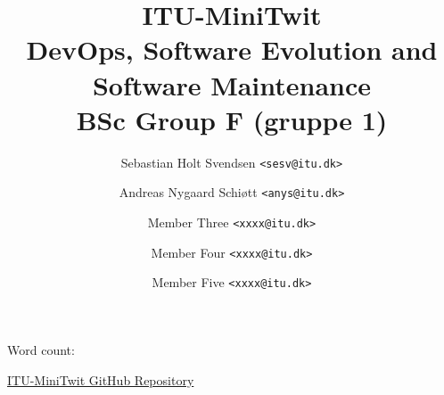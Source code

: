 \documentclass[a4paper,11pt]{article}
\title{
    \textbf{ITU-MiniTwit} \\[0.5em]
    \large DevOps, Software Evolution and Software Maintenance \\
    BSc Group F (gruppe 1)
}
\author{
    Sebastian Holt Svendsen \texttt{<sesv@itu.dk>} \and 
    Andreas Nygaard Schiøtt \texttt{<anys@itu.dk>} \and
    Member Three \texttt{<xxxx@itu.dk>} \and
    Member Four \texttt{<xxxx@itu.dk>} \and
    Member Five \texttt{<xxxx@itu.dk>}
}
\begin{document}
\immediate{}

\maketitle
\begin{center}
    \small Word count: \wordcount
\end{center}


\tableofcontents
\vspace{1cm}
\begin{center}
 \href{https://github.com/sebseb10/ITU-MiniTwit}{ITU-MiniTwit GitHub Repository}
\end{center}



\newpage





\end{document}
